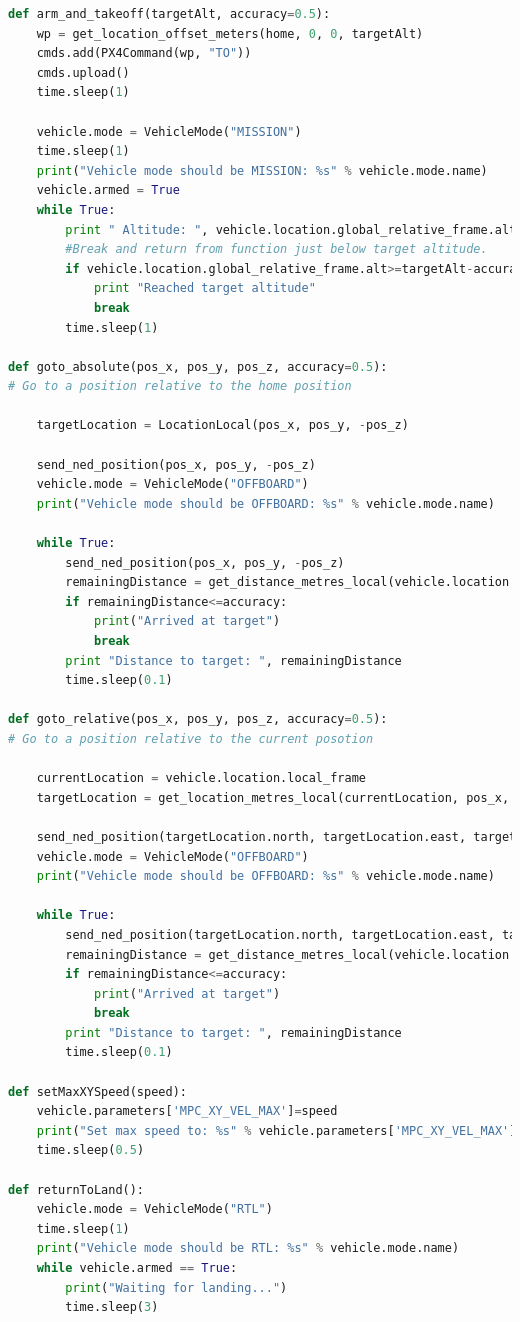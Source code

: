 \documentclass[10pt]{article}
\begin{document}
\begin{lstlisting}[language=Python]
def arm_and_takeoff(targetAlt, accuracy=0.5):
    wp = get_location_offset_meters(home, 0, 0, targetAlt)
    cmds.add(PX4Command(wp, "TO"))
    cmds.upload()
    time.sleep(1)

    vehicle.mode = VehicleMode("MISSION")
    time.sleep(1)
    print("Vehicle mode should be MISSION: %s" % vehicle.mode.name)
    vehicle.armed = True
    while True:
        print " Altitude: ", vehicle.location.global_relative_frame.alt
        #Break and return from function just below target altitude.
        if vehicle.location.global_relative_frame.alt>=targetAlt-accuracy:
            print "Reached target altitude"
            break
        time.sleep(1)

def goto_absolute(pos_x, pos_y, pos_z, accuracy=0.5):
# Go to a position relative to the home position

    targetLocation = LocationLocal(pos_x, pos_y, -pos_z)

    send_ned_position(pos_x, pos_y, -pos_z)
    vehicle.mode = VehicleMode("OFFBOARD")
    print("Vehicle mode should be OFFBOARD: %s" % vehicle.mode.name)

    while True:
        send_ned_position(pos_x, pos_y, -pos_z)
        remainingDistance = get_distance_metres_local(vehicle.location.local_frame, targetLocation)
        if remainingDistance<=accuracy:
            print("Arrived at target")
            break
        print "Distance to target: ", remainingDistance
        time.sleep(0.1)

def goto_relative(pos_x, pos_y, pos_z, accuracy=0.5):
# Go to a position relative to the current posotion

    currentLocation = vehicle.location.local_frame
    targetLocation = get_location_metres_local(currentLocation, pos_x, pos_y, -pos_z)\

    send_ned_position(targetLocation.north, targetLocation.east, targetLocation.down)
    vehicle.mode = VehicleMode("OFFBOARD")
    print("Vehicle mode should be OFFBOARD: %s" % vehicle.mode.name)

    while True:
        send_ned_position(targetLocation.north, targetLocation.east, targetLocation.down)
        remainingDistance = get_distance_metres_local(vehicle.location.local_frame, targetLocation)
        if remainingDistance<=accuracy:
            print("Arrived at target")
            break
        print "Distance to target: ", remainingDistance
        time.sleep(0.1)

def setMaxXYSpeed(speed):
    vehicle.parameters['MPC_XY_VEL_MAX']=speed
    print("Set max speed to: %s" % vehicle.parameters['MPC_XY_VEL_MAX'])
    time.sleep(0.5)

def returnToLand():
    vehicle.mode = VehicleMode("RTL")
    time.sleep(1)
    print("Vehicle mode should be RTL: %s" % vehicle.mode.name)
    while vehicle.armed == True:
        print("Waiting for landing...")
        time.sleep(3)
\end{lstlisting}
\end{document}
